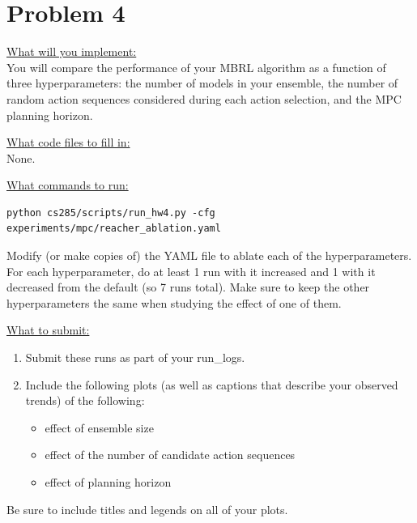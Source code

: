 \documentclass{article} %
\begin{document}
\newpage
\section*{Problem 4}

\underline{What will you implement:}\\ 
You will compare the performance of your MBRL algorithm as a function of three hyperparameters: the number of models in your ensemble, the number of random action sequences considered during each action selection, and the MPC planning horizon.

\underline{What code files to fill in:}\\
None.

\underline{What commands to run:}\\
\begin{lstlisting}[escapechar=@]
python cs285/scripts/run_hw4.py -cfg experiments/mpc/reacher_ablation.yaml
\end{lstlisting}

Modify (or make copies of) the YAML file to ablate each of the hyperparameters. For each hyperparameter, do at least 1 run with it increased and 1 with it decreased from the default (so 7 runs total). Make sure to keep the other hyperparameters the same when studying the effect of one of them.

\underline{What to submit:}
\begin{enumerate}
    \item Submit these runs as part of your run\_logs.
    \item Include the following plots (as well as captions that describe your observed trends) of the following:
\begin{itemize}
    \item effect of ensemble size
    \item effect of the number of candidate action sequences
    \item effect of planning horizon
\end{itemize}
\end{enumerate}

Be sure to include titles and legends on all of your plots.
\end{document}
